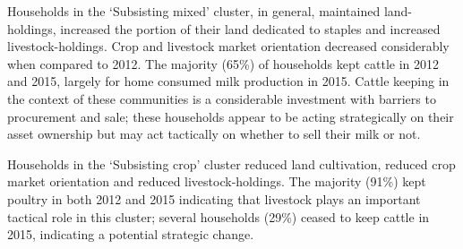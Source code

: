 Households in the `Subsisting mixed' cluster, in general, maintained land-holdings, increased the portion of their land dedicated to staples and increased livestock-holdings. Crop and livestock market orientation decreased considerably when compared to 2012. The majority (65\%) of households kept cattle in 2012 and 2015, largely for home consumed milk production in 2015. Cattle keeping in the context of these communities is a considerable investment with barriers to procurement and sale; these households appear to be acting strategically on their asset ownership but may act tactically on whether to sell their milk or not.

Households in the `Subsisting crop' cluster reduced land cultivation, reduced crop market orientation and reduced livestock-holdings. The majority (91\%) kept poultry in both 2012 and 2015 indicating that livestock plays an important tactical role in this cluster; several households (29\%) ceased to keep cattle in 2015, indicating a potential strategic change.



